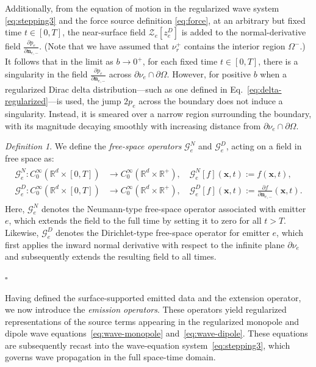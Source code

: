 \documentclass[11pt,reqno]{amsart}
\theoremstyle{remark}
\newtheorem{definition}{Definition}
\theoremstyle{italic_lemma}
\newcommand{\bx}{\boldsymbol{x}}
\newcommand{\bn}{\boldsymbol{n}}
\begin{document}
Additionally, from the equation of motion in the regularized wave system \eqref{eq:stepping3} and the force source definition \eqref{eq:force}, at an arbitrary but fixed time $t \in [0,T]$, the near-surface field \(\mathcal{Z}_e \left[ z_e^D  \right] \) is added to the normal-derivative field \( \frac{\partial p_e}{\partial \bn_{e,-}} \). (Note that we have assumed that \( \nu_r^+ \) contains the interior region \( \Omega^- \).) It follows that in the limit as $b \rightarrow 0^+$, for each fixed time \( t \in [0,T] \), there is a singularity in the field \( \frac{\partial p_e}{\partial \bn_{e,-}} \) across \(  \partial \nu_e \cap \partial \Omega   \). However, for positive $b$ when a regularized Dirac delta distribution---such as one defined in Eq.~\eqref{eq:delta-regularized}---is used, the jump \(2 p_e\) across the boundary does not induce a singularity. Instead, it is smeared over a narrow region surrounding the boundary, with its magnitude decaying smoothly with increasing distance from \(  \partial \nu_e \cap \partial \Omega  \).


\begin{definition}
We define the \emph{free-space operators} \( \mathcal{G}_e^N \) and \( \mathcal{G}_e^D \), acting on a field in free space as:
\begin{align}
    \begin{split}
        \mathcal{G}_e^N : C_0^{\infty}\left( \mathbb{R}^d \times [0,T] \right) &\rightarrow C_0^{\infty}\left( \mathbb{R}^d \times \mathbb{R}^+ \right), \quad \mathcal{G}_e^N[f](\bx, t) := f(\bx, t), \\
        \mathcal{G}_e^D : C_0^{\infty}\left( \mathbb{R}^d \times [0,T] \right) &\rightarrow C_0^{\infty}\left( \mathbb{R}^d \times \mathbb{R}^+ \right), \quad \mathcal{G}_e^D[f](\bx, t) := \frac{\partial f}{\partial \bn_{e,-}}(\bx, t).
    \end{split}
\end{align}
Here, $\mathcal{G}_e^N$ denotes the Neumann-type free-space operator associated with emitter $e$, which extends the field to the full time by setting it to zero for all $t > T$. Likewise, $\mathcal{G}_e^D$ denotes the Dirichlet-type free-space operator for emitter $e$, which first applies the inward normal derivative with respect to the infinite plane $\partial \nu_e$ and subsequently extends the resulting field to all times.
\end{definition}
\hfill \(\square\)

Having defined the surface-supported emitted data and the extension operator, we now introduce the \emph{emission operators}. These operators yield regularized representations of the source terms appearing in the regularized monopole and dipole wave equations~\eqref{eq:wave-monopole} and~\eqref{eq:wave-dipole}. These equations are subsequently recast into the wave-equation system~\eqref{eq:stepping3}, which governs wave propagation in the full space-time domain.
\end{document}
